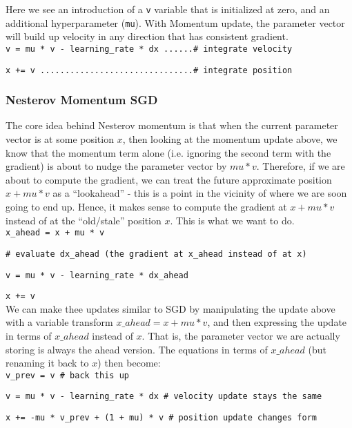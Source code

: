 \documentclass[letterpaper]{article}
\begin{document}
Here we see an introduction of a \texttt{v} variable that is initialized at zero, and an additional hyperparameter (\texttt{mu}). With Momentum update, the parameter vector will build up velocity in any direction that has consistent gradient.\\

\texttt{v = mu * v - learning\_rate * dx ......\# integrate velocity}

\texttt{x += v ...............................\# integrate position}

\subsubsection{Nesterov Momentum SGD}

The core idea behind Nesterov momentum is that when the current parameter vector is at some position \(x\), then looking at the momentum update above, we know that the momentum term alone (i.e. ignoring the second term with the gradient) is about to nudge the parameter vector by \(mu * v\). Therefore, if we are about to compute the gradient, we can treat the future approximate position \(x + mu * v\) as a “lookahead” - this is a point in the vicinity of where we are soon going to end up. Hence, it makes sense to compute the gradient at \(x + mu * v\) instead of at the “old/stale” position \(x\). This is what we want to do.\\

\texttt{x\_ahead = x + mu * v}

\texttt{\# evaluate dx\_ahead (the gradient at x\_ahead instead of at x)}

\texttt{v = mu * v - learning\_rate * dx\_ahead}

\texttt{x += v}\\


We can make thee updates similar to SGD by manipulating the update above with a variable transform \(x\_ahead = x + mu * v\), and then expressing the update in terms of \(x\_ahead\) instead of \(x\). That is, the parameter vector we are actually storing is always the ahead version. The equations in terms of \(x\_ahead\) (but renaming it back to \(x\)) then become:\\

\texttt{v\_prev = v \# back this up}

\texttt{v = mu * v - learning\_rate * dx \# velocity update stays the same}

\texttt{x += -mu * v\_prev + (1 + mu) * v \# position update changes form}\\
\end{document}
